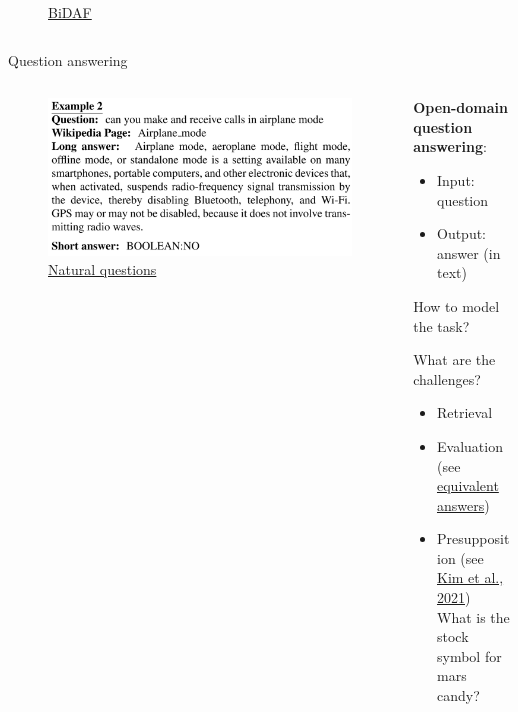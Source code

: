 \documentclass[usenames,dvipsnames,notes,11pt,aspectratio=169,hyperref={colorlinks=true, linkcolor=blue}]{beamer}
\newcommand{\pdfnote}[1]{}
\begin{document}
\begin{frame}
\begin{columns}
\begin{column}{0.5\textwidth}
\begin{figure}
                \caption{\href{https://arxiv.org/pdf/1611.01603}{BiDAF}}
            \end{figure}
        \end{column}
    \end{columns}
\end{frame}

\begin{frame}
    {Question answering}
    \begin{columns}
        \begin{column}{0.5\textwidth}
            \begin{figure}
                \includegraphics[height=0.5\textwidth]{figures/nq}
                \caption{\href{https://aclanthology.org/Q19-1026.pdf}{Natural questions}}
            \end{figure}
        \end{column}
        \begin{column}{0.5\textwidth}
            \textbf{Open-domain question answering}:\\
            \begin{itemize}
                \item[] Input: question
                \item[] Output: answer (in text)
            \end{itemize}
            How to model the task?\pause

            \bigskip
            What are the challenges?\\
            \begin{itemize}
                \item Retrieval
                \item Evaluation (see \href{https://arxiv.org/abs/2109.05289}{equivalent answers})
                \item Presupposition (see \href{https://aclanthology.org/2021.acl-long.304.pdf}{Kim et al., 2021})\\
                    What is the stock symbol for mars candy?
                    \pdfnote{mars is not a publicly traded company}
            \end{itemize}
        \end{column}
    \end{columns}
\end{frame}
\end{document}
